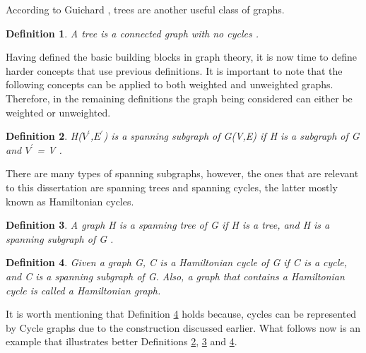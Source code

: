 \documentclass[12pt]{article}
\newtheorem{definition}{Definition}[subsection]
\numberwithin{equation}{subsection}
\numberwithin{table}{subsection}
\numberwithin{algorithm}{subsection}
\numberwithin{figure}{subsection}
\begin{document}
According to Guichard \cite{guichard_2018}, trees are another useful class of graphs.
\begin{definition}
\label{tree}
A tree is a connected graph with no cycles .
\end{definition}
Having defined the basic building blocks in graph theory, it is now time to define harder concepts that use previous definitions. It is important to note that the following concepts can be applied to both weighted and unweighted graphs. Therefore, in the remaining definitions the graph being considered can either be weighted or unweighted.
\begin{definition}
\label{spanning subgraph}
H($V^\prime$,$E^\prime$) is a spanning subgraph of G(V,E) if H is a subgraph of G and $V^\prime$ = V .
\end{definition}
There are many types of spanning subgraphs, however, the ones that are relevant to this dissertation are spanning trees and spanning cycles, the latter mostly known as Hamiltonian cycles.
\begin{definition}
A graph H is a spanning tree of G if H is a tree, and H is a spanning subgraph of G .
\label{spanning tree}
\end{definition}
\begin{definition}
\label{hamiltonian cycle}
Given a graph G, C is a Hamiltonian cycle of G if C is a cycle, and C is a spanning subgraph of G. Also, a graph that contains a Hamiltonian cycle is called a Hamiltonian graph. 
\end{definition}
It is worth mentioning that Definition \ref{hamiltonian cycle} holds because, cycles can be represented by Cycle graphs due to the construction discussed earlier. What follows now is an example that illustrates better Definitions \ref{spanning subgraph}, \ref{spanning tree} and \ref{hamiltonian cycle}. 
\end{document}
